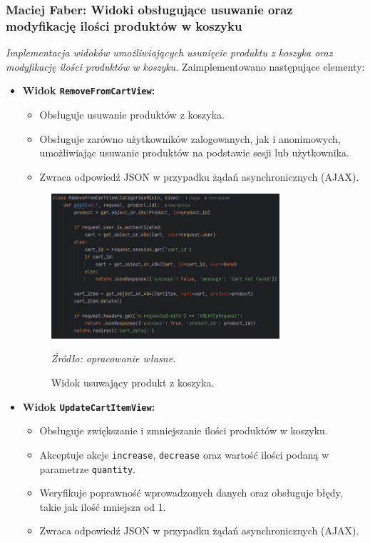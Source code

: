 \documentclass[12pt,a4paper,oneside]{article}
\theoremstyle{definition}
\numberwithin{equation}{section}
\begin{document}
\subsubsection{Maciej Faber: Widoki obsługujące usuwanie oraz modyfikację ilości produktów w koszyku}
\label{section:1.3.40}
\textit{
Implementacja widoków umożliwiających usunięcie produktu z koszyka oraz modyfikację ilości produktów w koszyku.
}
Zaimplementowano następujące elementy:
\begin{itemize}
    \item \textbf{Widok \texttt{RemoveFromCartView}:}
    \begin{itemize}
        \item Obsługuje usuwanie produktów z koszyka.
        \item Obsługuje zarówno użytkowników zalogowanych, jak i anonimowych, umożliwiając usuwanie produktów na podstawie sesji lub użytkownika.
        \item Zwraca odpowiedź JSON w przypadku żądań asynchronicznych (AJAX).
    \end{itemize}
    \begin{figure}[H]
        \centering
        \includegraphics[width=0.8\textwidth]{images/krzysztofBImages/remove_from_cart_view.png}
        \caption{Widok usuwający produkt z koszyka.}
        \emph{Źródło: opracowanie własne.}
        \label{fig:remove_item_cart}
    \end{figure}
    \item \textbf{Widok \texttt{UpdateCartItemView}:}
    \begin{itemize}
        \item Obsługuje zwiększanie i zmniejszanie ilości produktów w koszyku.
        \item Akceptuje akcje \texttt{increase}, \texttt{decrease} oraz wartość ilości podaną w parametrze \texttt{quantity}.
        \item Weryfikuje poprawność wprowadzonych danych oraz obsługuje błędy, takie jak ilość mniejsza od 1.
        \item Zwraca odpowiedź JSON w przypadku żądań asynchronicznych (AJAX).
    \end{itemize}
\end{itemize}
\end{document}
